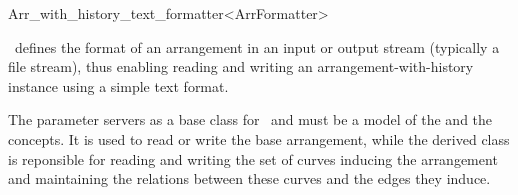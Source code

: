 
\ccRefPageBegin

\begin{ccRefClass}{Arr_with_history_text_formatter<ArrFormatter>}

\ccDefinition

\ccRefName\ defines the format of an arrangement in an input or output stream
(typically a file stream), thus enabling reading and writing an
arrangement-with-history instance using a simple text format.

The  parameter servers as a base class for
\ccRefName\ and must be a model of the 
and the  concepts. It is used to read or write
the base arrangement, while the derived class is reponsible for reading and
writing the set of curves inducing the arrangement and maintaining the
relations between these curves and the edges they induce.


\ccIsModel
     \\

\ccSeeAlso
     \\

\end{ccRefClass}

\ccRefPageEnd
